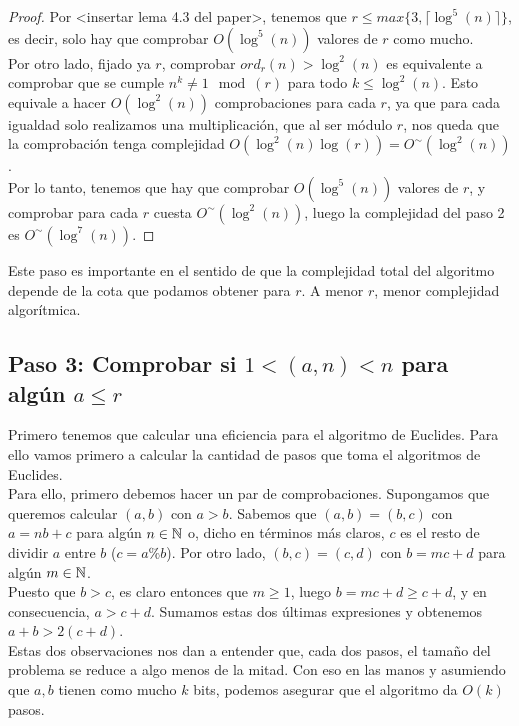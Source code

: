 \begin{proof}
	Por <insertar lema 4.3 del paper>, tenemos que $r \leq max\{3, \lceil \log^5(n) \rceil \}$, es decir, solo hay que comprobar $O(\log^5(n))$ valores de $r$ como mucho.\\
	
	Por otro lado, fijado ya $r$, comprobar $ord_r(n) > \log^2(n)$ es equivalente a comprobar que se cumple $n^k \neq 1 \mod(r)$ para todo $k \leq \log^2(n)$. Esto equivale a hacer $O(\log^2(n))$ comprobaciones para cada $r$, ya que para cada igualdad solo realizamos una multiplicación, que al ser módulo $r$, nos queda que la comprobación tenga complejidad $O(\log^2(n)\log(r)) = O^\sim(\log^2(n))$.\\
	
	Por lo tanto, tenemos que hay que comprobar $O(\log^5(n))$ valores de $r$, y comprobar para cada $r$ cuesta $O^\sim(\log^2(n))$, luego la complejidad del paso 2 es $O^\sim(\log^7(n))$.
\end{proof}

Este paso es importante en el sentido de que la complejidad total del algoritmo depende de la cota que podamos obtener para $r$. A menor $r$, menor complejidad algorítmica.

\subsection{Paso 3: Comprobar si $1 < (a, n) < n$ para algún $a \leq r$}

Primero tenemos que calcular una eficiencia para el algoritmo de Euclides. Para ello vamos primero a calcular la cantidad de pasos que toma el algoritmos de Euclides.\\

Para ello, primero debemos hacer un par de comprobaciones. Supongamos que queremos calcular $(a, b)$ con $a > b$. Sabemos que $(a, b) = (b, c)$ con $a = nb + c$ para algún $n \in \mathbb{N}$ o, dicho en términos más claros, $c$ es el resto de dividir $a$ entre $b$ ($c = a \% b$). Por otro lado, $(b, c) = (c, d)$ con $b = mc + d$ para algún $m \in \mathbb{N}$.\\

Puesto que $b > c$, es claro entonces que $m \geq 1$, luego $b = mc + d \geq c + d$, y en consecuencia, $a > c + d$. Sumamos estas dos últimas expresiones y obtenemos $a + b > 2(c + d)$.\\

Estas dos observaciones nos dan a entender que, cada dos pasos, el tamaño del problema se reduce a algo menos de la mitad. Con eso en las manos y asumiendo que $a, b$ tienen como mucho $k$ bits, podemos asegurar que el algoritmo da $O(k)$ pasos.\\

